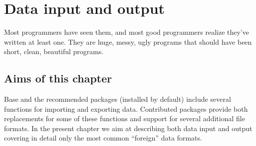 \documentclass[krantz2]{krantz}\usepackage{knitr}%
\begin{document}

\frontmatter

\maketitle


\setcounter{page}{7} %
\tableofcontents
%

\listoffigures
\listoftables
%
%

\mainmatter




















\chapter{Data input and output}\label{chap:R:data:io}\label{sec:data:io}

\begin{VF}
Most programmers have seen them, and most good programmers realize they've written at least one. They are huge, messy, ugly programs that should have been short, clean, beautiful programs.

\end{VF}



\section{Aims of this chapter}

Base \Rlang and the recommended packages (installed by default) include several functions for importing and exporting data. Contributed packages provide both replacements for some of these functions and support for several additional file formats. In the present chapter we aim at describing both data input and output covering in detail only the most common ``foreign'' data formats.
\end{document}
